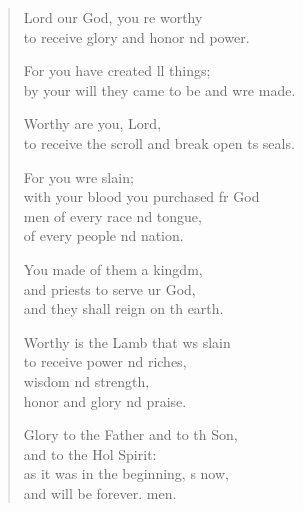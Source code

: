 \settowidth{\versewidth}{to receive the scroll and break open its seals.}
\begin{verse}%
  \begin{patverse}
 Lord our God, you re worthy\Med\\
to receive glory and honor nd power.

For you have created ll things;\Med\\
by your will they came to be and wre made.

Worthy are you,  Lord,\Med\\
to receive the scroll and break open \pointup{\i}ts seals.

For you wre slain;\Med\\
with your blood you purchased fr God\\
men of every race nd tongue,\Med\\
of every people nd nation.

You made of them a kingdm,\Flex\\
and priests to serve ur God,\Med\\
and they shall reign on th earth.

Worthy is the Lamb that ws slain\Med\\
to receive power nd riches,\Med\\
wisdom nd strength,\\
honor and glory nd praise.

Glory to the Father and to th Son,\Med\\
and to the Hol Spirit:\\
as it was in the beginning, \pointup{\i}s now,\Med\\
and will be forever. men.
  \end{patverse}
\end{verse}
